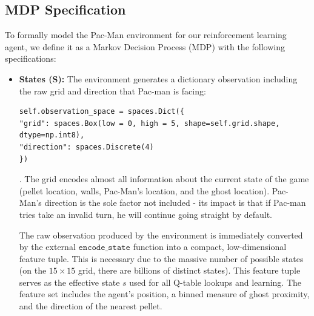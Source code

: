 \documentclass{article}
\begin{document}
\subsection{MDP Specification}

To formally model the Pac-Man environment for our reinforcement learning agent, we define it as a Markov Decision Process (MDP) with the following specifications:

\begin{itemize}
\item \textbf{States (S):} The environment generates a dictionary observation including the raw grid and direction that Pac-man is facing:
\begin{verbatim}
self.observation_space = spaces.Dict({
"grid": spaces.Box(low = 0, high = 5, shape=self.grid.shape, dtype=np.int8),
"direction": spaces.Discrete(4)
})
\end{verbatim}. The grid encodes almost all information about the current state of the game (pellet location, walls, Pac-Man's location, and the ghost location). Pac-Man's direction is the sole factor not included - its impact is that if Pac-man tries take an invalid turn, he will continue going straight by default. 

The raw observation produced by the environment is immediately converted by the external $\texttt{encode\_state}$ function into a compact, low-dimensional feature tuple. This is necessary due to the massive number of possible states (on the $15 \times 15$ grid, there are billions of distinct states). This feature tuple serves as the effective state $s$ used for all Q-table lookups and learning. The feature set includes the agent's position, a binned measure of ghost proximity, and the direction of the nearest pellet.


\end{itemize}
\end{document}
